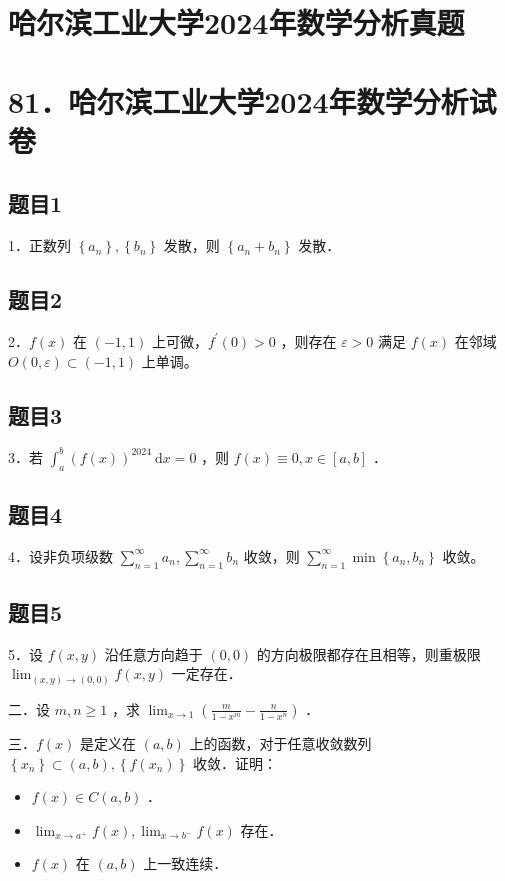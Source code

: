\documentclass{article}
\begin{document}
\section*{哈尔滨工业大学2024年数学分析真题}
\section*{81．哈尔滨工业大学2024年数学分析试卷}

\subsection{题目1}
1．正数列 \(\left\{a_{n}\right\},\left\{b_{n}\right\}\) 发散，则 \(\left\{a_{n}+b_{n}\right\}\) 发散．

\subsection{题目2}
2．\(f(x)\) 在 \((-1,1)\) 上可微，\(f^{\prime}(0)>0\) ，则存在 \(\varepsilon>0\) 满足 \(f(x)\) 在邻域 \(O(0, \varepsilon) \subset(-1,1)\) 上单调。

\subsection{题目3}
3．若 \(\int_{a}^{b}(f(x))^{2024} \mathrm{~d} x=0\) ，则 \(f(x) \equiv 0, x \in[a, b]\) ．

\subsection{题目4}
4．设非负项级数 \(\sum_{n=1}^{\infty} a_{n}, \sum_{n=1}^{\infty} b_{n}\) 收敛，则 \(\sum_{n=1}^{\infty} \min \left\{a_{n}, b_{n}\right\}\) 收敛。

\subsection{题目5}
5．设 \(f(x, y)\) 沿任意方向趋于 \((0,0)\) 的方向极限都存在且相等，则重极限 \(\lim _{(x, y) \rightarrow(0,0)} f(x, y)\) 一定存在．

二．设 \(m, n \geq 1\) ，求 \(\lim _{x \rightarrow 1}\left(\frac{m}{1-x^{m}}-\frac{n}{1-x^{n}}\right)\) ．

三．\(f(x)\) 是定义在 \((a, b)\) 上的函数，对于任意收敛数列 \(\left\{x_{n}\right\} \subset(a, b),\left\{f\left(x_{n}\right)\right\}\) 收敛．证明：

\begin{itemize}
  \item[（1）] \(f(x) \in C(a, b)\) ．
  \item[（2）] \(\lim _{x \rightarrow a^{+}} f(x), \lim _{x \rightarrow b^{-}} f(x)\) 存在．
  \item[（3）] \(f(x)\) 在 \((a, b)\) 上一致连续．
\end{itemize}
\end{document}
